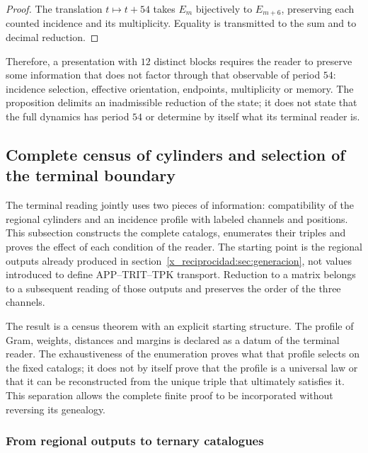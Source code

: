 \begin{proof}
The translation \(t\mapsto t+54\) takes \(E_m\) bijectively
to \(E_{m+6}\), preserving each counted incidence and its multiplicity.
Equality is transmitted to the sum and to decimal reduction.
\end{proof}

Therefore, a presentation with \(12\) distinct blocks requires the
reader to preserve some information that does not factor through that observable
of period \(54\): incidence selection, effective orientation,
endpoints, multiplicity or memory. The proposition delimits an inadmissible
reduction of the state; it does not state that the full dynamics has
period \(54\) or determine by itself what its terminal reader is.



\subsection{Complete census of cylinders and selection of the terminal boundary}
\label{x_reciprocidad:censo:terminal-completo}

The terminal reading jointly uses two pieces of information: compatibility
of the regional cylinders and an incidence profile with labeled channels and
positions. This subsection constructs the complete catalogs,
enumerates their triples and proves the effect of each condition of the reader.
The starting point is the regional outputs already produced in
section~\ref{x_reciprocidad:sec:generacion}, not values introduced to define
APP--TRIT--TPK transport. Reduction to a matrix belongs to a subsequent
reading of those outputs and preserves the order of the three channels.

The result is a census theorem with an explicit starting structure.
The profile of Gram, weights, distances and margins is declared as a datum of the
terminal reader. The exhaustiveness of the enumeration proves what
that profile selects on the fixed catalogs; it does not by itself prove that the
profile is a universal law or that it can be reconstructed from the unique triple
that ultimately satisfies it. This separation allows the complete finite
proof to be incorporated without reversing its genealogy.

\subsubsection{From regional outputs to ternary catalogues}

